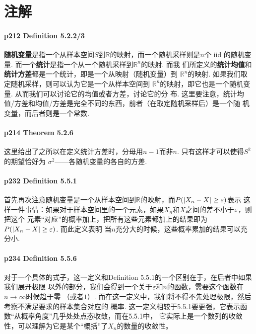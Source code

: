 \newpage
\section{注解}
  \paragraph{p212 Definition 5.2.2/3}
    \textbf{随机变量}是指一个从样本空间$S$到$\mathbb{R}$的映射，而一个随机采样则是$n$个
    iid 的随机变量. 而一个\textbf{统计}是指一个从一个随机采样到$\mathbb{R}^n$的映射. 而我
    们所定义的\textbf{统计均值}和\textbf{统计方差}都是一个统计，即是一个从映射（随机变量）到
    $\mathbb{R}^n$的映射. 如果我们取定随机采样，则可以认为它是一个从样本空间到
    $\mathbb{R}^n$的映射，即它也是一个随机变量. 从而我们可以讨论它的均值或者方差，讨论它的分
    布. 这里要注意，统计均值/方差和均值/方差是完全不同的东西，前者（在取定随机采样后）是一个随
    机变量，而后者则是一个常数. 

  \paragraph{p214 Theorem 5.2.6}
    这里给出了之所以在定义统计方差时，分母用$n-1$而非$n$. 只有这样才可以使得$S^2$的期望恰好为
    $\sigma^2$——各随机变量的各自的方差. 

  \paragraph{p232 Definition 5.5.1}
    首先再次注意随机变量是一个从样本空间到$\mathbb{R}$的映射，而$P(|X_n-X|\ge\varepsilon)$表示
    这样一件事情：如果对于样本空间里的一个元素，如果$X_n$和$X$之间的差不小于$\varepsilon$，则把这个
    元素“对应”的概率加上，把所有这些元素都加上的结果即为$P(|X_n-X|\ge\varepsilon)$. 而此定义表明
    当$n$充分大的时候，这些概率累加的结果可以充分小. 

  \paragraph{p234 Definition 5.5.6}
    对于一个具体的式子，这一定义和Definition 5.5.1的一个区别在于，在后者中如果我们展开极限
    以外的部分，我们会得到一个关于$\varepsilon$和$n$的函数，需要这个函数在$n\to\infty$时候趋于零
    （或者$1$）. 而在这一定义中，我们将不得不先处理极限，然后考察不满足要求的样本集合对应的
    概率. 这一定义相较于5.5.1要更强，它表示函数“从概率角度”几乎处处点态收敛，而在5.5.1中，
    它实际上是一个数列的收敛性，可以理解为它是某个“概括”了$X_n$的数量的收敛性。


